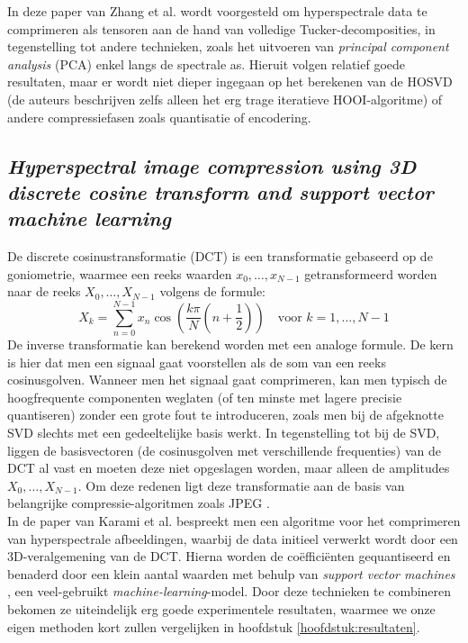 In deze paper van Zhang et al. \cite{ref:zhang} wordt voorgesteld om hyperspectrale data te comprimeren als tensoren aan de hand van volledige Tucker-decomposities, in tegenstelling tot andere technieken, zoals het uitvoeren van \textit{principal component analysis} (PCA) \cite{ref:pca} enkel langs de spectrale as. Hieruit volgen relatief goede resultaten, maar er wordt niet dieper ingegaan op het berekenen van de HOSVD (de auteurs beschrijven zelfs alleen het erg trage iteratieve HOOI-algoritme) of andere compressiefasen zoals quantisatie of encodering.

\subsection{\textit{Hyperspectral image compression using 3D discrete cosine transform and support vector machine learning}}

De discrete cosinustransformatie (DCT) \cite{ref:dct} is een transformatie gebaseerd op de goniometrie, waarmee een reeks waarden $x_0, \dots, x_{N-1}$ getransformeerd worden naar de reeks $X_0, \dots, X_{N-1}$ volgens de formule:
\[
X_k = \sum_{n=0}^{N-1} x_n \cos \left( \frac{k \pi}{N} \left( n + \frac{1}{2} \right) \right) \quad \text{voor } k = 1, \dots, N - 1
\]
De inverse transformatie kan berekend worden met een analoge formule. De kern is hier dat men een signaal gaat voorstellen als de som van een reeks cosinusgolven. Wanneer men het signaal gaat comprimeren, kan men typisch de hoogfrequente componenten weglaten (of ten minste met lagere precisie quantiseren) zonder een grote fout te introduceren, zoals men bij de afgeknotte SVD slechts met een gedeeltelijke basis werkt. In tegenstelling tot bij de SVD, liggen de basisvectoren (de cosinusgolven met verschillende frequenties) van de DCT al vast en moeten deze niet opgeslagen worden, maar alleen de amplitudes $X_0, \dots, X_{N-1}$. Om deze redenen ligt deze transformatie aan de basis van belangrijke compressie-algoritmen zoals JPEG \cite{ref:jpeg}.\\

In de paper van Karami et al. \cite{ref:karami} bespreekt men een algoritme voor het comprimeren van hyperspectrale afbeeldingen, waarbij de data initieel verwerkt wordt door een 3D-veralgemening van de DCT. Hierna worden de co\"effici\"enten gequantiseerd en benaderd door een klein aantal waarden met behulp van \textit{support vector machines} \cite{ref:svm}, een veel-gebruikt \textit{machine-learning}-model. Door deze technieken te combineren bekomen ze uiteindelijk erg goede experimentele resultaten, waarmee we onze eigen methoden kort zullen vergelijken in hoofdstuk \ref{hoofdstuk:resultaten}.

